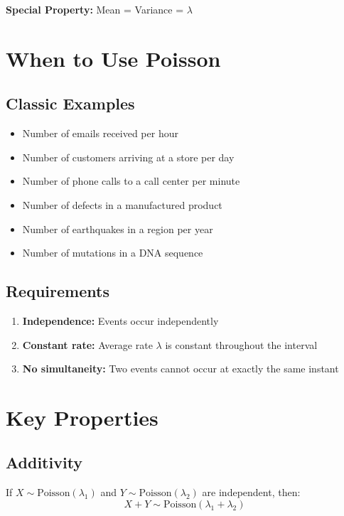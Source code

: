 \documentclass[11pt]{article}
\begin{document}
\begin{tcolorbox}[colback=red!5!white,colframe=red!75!black]
\textbf{Special Property:} Mean = Variance = $\lambda$
\end{tcolorbox}

\section{When to Use Poisson}

\subsection{Classic Examples}
\begin{itemize}
    \item Number of emails received per hour
    \item Number of customers arriving at a store per day
    \item Number of phone calls to a call center per minute
    \item Number of defects in a manufactured product
    \item Number of earthquakes in a region per year
    \item Number of mutations in a DNA sequence
\end{itemize}

\subsection{Requirements}
\begin{enumerate}
    \item \textbf{Independence:} Events occur independently
    \item \textbf{Constant rate:} Average rate $\lambda$ is constant throughout the interval
    \item \textbf{No simultaneity:} Two events cannot occur at exactly the same instant
\end{enumerate}

\section{Key Properties}

\subsection{Additivity}
If $X \sim \text{Poisson}(\lambda_1)$ and $Y \sim \text{Poisson}(\lambda_2)$ are independent, then:
\[
X + Y \sim \text{Poisson}(\lambda_1 + \lambda_2)
\]
\end{document}
